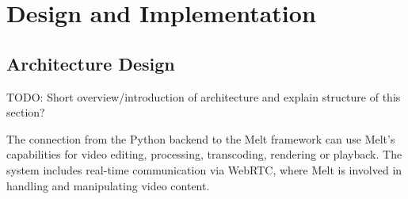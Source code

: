 \documentclass[../MasterThesis.tex]{subfiles}
\begin{document}
	
	
	
%
%
%
%
%
%
%
%
\newpage
\section{Design and Implementation} \label{section:designandimplementation}







\subsection{Architecture Design} \label{subsection:architecturedesign}


TODO: Short overview/introduction of architecture and explain structure of this section?





The connection from the Python backend to the Melt framework can use Melt's capabilities for video editing, processing, transcoding, rendering or playback. The system includes real-time communication via WebRTC, where Melt is involved in handling and manipulating video content.
\end{document}
